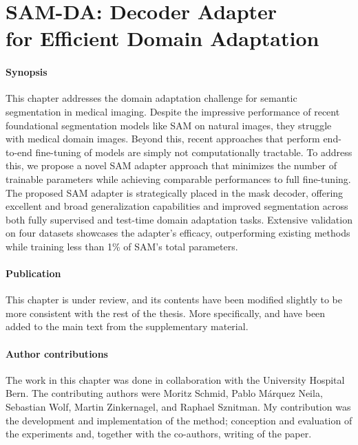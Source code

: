\graphicspath{{ch4_sam_da/}{Figures/}}

\chapter{SAM-DA: Decoder Adapter \\for Efficient Domain Adaptation}
\label{chapter:samda}


\subsubsection{Synopsis}This chapter addresses the domain adaptation challenge for semantic segmentation in medical imaging. Despite the impressive performance of recent foundational segmentation models like SAM on natural images, they struggle with medical domain images. Beyond this, recent approaches that perform end-to-end fine-tuning of models are simply not computationally tractable. To address this, we propose a novel SAM adapter approach that minimizes the number of trainable parameters while achieving comparable performances to full fine-tuning. The proposed SAM adapter is strategically placed in the mask decoder, offering excellent and broad generalization capabilities and improved segmentation across both fully supervised and test-time domain adaptation tasks. Extensive validation on four datasets showcases the adapter's efficacy, outperforming existing methods while training less than 1\% of SAM's total parameters.

\subsubsection{Publication}This chapter is under review, and its contents have been modified slightly to be more consistent with the rest of the thesis. More specifically,  and  have been added to the main text from the supplementary material.

\subsubsection{Author contributions}The work in this chapter was done in collaboration with the University Hospital Bern. The contributing authors were Moritz Schmid, Pablo Márquez Neila, Sebastian Wolf, Martin Zinkernagel, and Raphael Sznitman. My contribution was the development and implementation of the method; conception and evaluation of the experiments and, together with the co-authors, writing of the paper.






